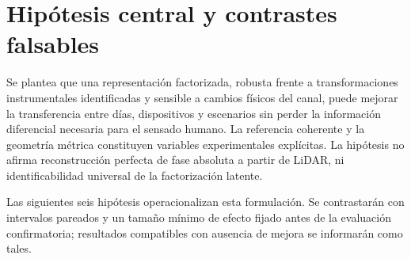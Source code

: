 \section{Hipótesis central y contrastes falsables}
\label{sec:updated_hypotheses}

Se plantea que una representación factorizada, robusta frente a transformaciones
instrumentales identificadas y sensible a cambios físicos del canal, puede mejorar
la transferencia entre días, dispositivos y escenarios sin perder la información
diferencial necesaria para el sensado humano. La referencia coherente y la geometría
métrica constituyen variables experimentales explícitas. La hipótesis no afirma
reconstrucción perfecta de fase absoluta a partir de LiDAR, ni identificabilidad
universal de la factorización latente.

Las siguientes seis hipótesis operacionalizan esta formulación. Se contrastarán con
intervalos pareados y un tamaño mínimo de efecto fijado antes de la evaluación
confirmatoria; resultados compatibles con ausencia de mejora se informarán como tales.
